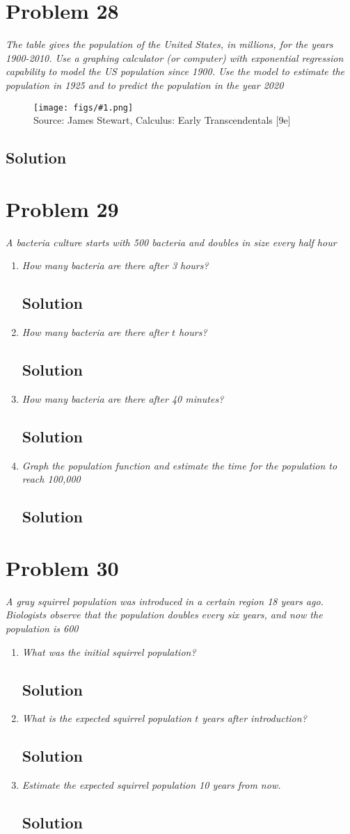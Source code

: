 \documentclass[11pt]{article}
\newcommand{\soln}{\subsection*}
\newcommand{\qn}{\textit}
\newcommand{\imagesource}[1]{{\footnotesize Source: #1}}
\newcommand{\imgqn}[1]{
	\begin{figure}[H]
		\centering
		\texttt{[image: figs/\#1.png]}\\
		\imagesource{James Stewart, Calculus: Early Transcendentals [9e]}
	\end{figure}
}
\begin{document}
\section*{Problem 28}

\qn{The table gives the population of the United States, in millions, for the years 1900-2010. Use a graphing calculator (or computer) with exponential regression capability to model the US population since 1900. Use the model to estimate the population in 1925 and to predict the population in the year 2020}
\imgqn{1.4.28}

\soln{Solution}

\section*{Problem 29}

\qn{A bacteria culture starts with 500 bacteria and doubles in size every half hour}

\begin{enumerate}
	\item \qn{How many bacteria are there after 3 hours?}
	\soln{Solution}
	
	\item \qn{How many bacteria are there after $t$ hours?}
	\soln{Solution}
	
	\item \qn{How many bacteria are there after 40 minutes?}
	\soln{Solution}
	
	\item \qn{Graph the population function and estimate the time for the population to reach 100,000}
	\soln{Solution}
\end{enumerate}

\section*{Problem 30}

\qn{A gray squirrel population was introduced in a certain region 18 years ago. Biologists observe that the population doubles every six years, and now the population is 600}

\begin{enumerate}
	\item \qn{What was the initial squirrel population?}
	\soln{Solution}
	
	\item \qn{What is the expected squirrel population $t$ years after introduction?}
	\soln{Solution}
	
	\item \qn{Estimate the expected squirrel population 10 years from now.}
	\soln{Solution}
\end{enumerate}
\end{document}
